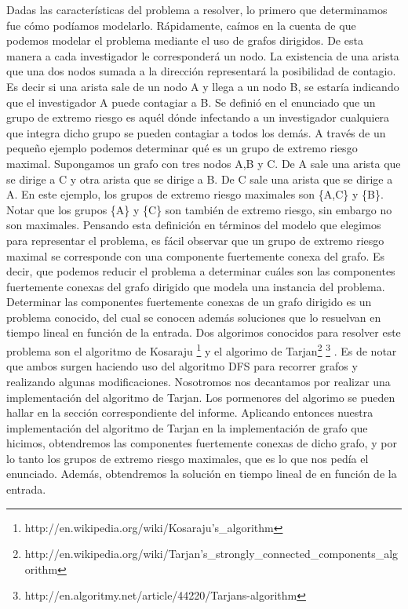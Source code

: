 \quad Dadas las características del problema a resolver, lo primero que determinamos fue cómo podíamos modelarlo. Rápidamente, caímos en la cuenta de que podemos modelar el problema mediante el uso de grafos dirigidos. De esta manera a cada investigador le corresponderá un nodo. La existencia de una arista que una dos nodos sumada a la dirección representará la posibilidad de contagio. Es decir si una arista sale de un nodo A y llega a un nodo B, se estaría indicando que el investigador A puede contagiar a B.
\quad Se definió en el enunciado que un grupo de extremo riesgo es aquél dónde infectando a un investigador cualquiera que integra dicho grupo se pueden contagiar a todos los demás. A través de un pequeño ejemplo podemos determinar qué es un grupo de extremo riesgo maximal.
\quad Supongamos un grafo con tres nodos A,B y C. De A sale una arista que se dirige a C y otra arista que se dirige a B. De C sale una arista que se dirige a A. En este ejemplo, los grupos de extremo riesgo maximales son \{A,C\} y \{B\}. Notar que los grupos \{A\} y \{C\} son también de extremo riesgo, sin embargo no son maximales.
\quad Pensando esta definición en términos del modelo que elegimos para representar el problema, es fácil observar que un grupo de extremo riesgo maximal se corresponde con una componente fuertemente conexa del grafo. Es decir, que podemos reducir el problema a determinar cuáles son las componentes fuertemente conexas del grafo dirigido que modela una instancia del problema. 
\quad Determinar las componentes fuertemente conexas de un grafo dirigido es un problema conocido, del cual se conocen además soluciones que lo resuelvan en tiempo lineal en función de la entrada.
\quad Dos algorimos conocidos para resolver este problema son el algoritmo de Kosaraju \footnote{http://en.wikipedia.org/wiki/Kosaraju's_algorithm} y el algorimo de Tarjan\footnote{http://en.wikipedia.org/wiki/Tarjan's_strongly_connected_components_algorithm} \footnote{http://en.algoritmy.net/article/44220/Tarjans-algorithm} . Es de notar que ambos surgen haciendo uso del algoritmo DFS para recorrer grafos y realizando algunas modificaciones.  Nosotromos nos decantamos por realizar una implementación del algoritmo de Tarjan. Los pormenores del algorimo se pueden hallar en la sección correspondiente del informe.
\quad Aplicando entonces nuestra implementación del algoritmo de Tarjan en la implementación de grafo que hicimos, obtendremos las componentes fuertemente conexas de dicho grafo, y por lo tanto los grupos de extremo riesgo maximales, que es lo que nos pedía el enunciado. Además, obtendremos la solución en tiempo lineal de en función de la entrada.


